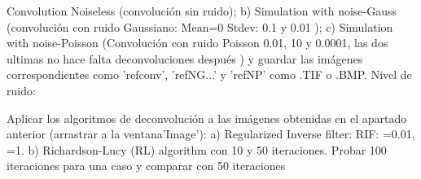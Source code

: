 \documentclass{./packages/optica-article}
\begin{document}
      Convolution Noiseless (convolución sin ruido);
        b) Simulation with noise-Gauss (convolución con ruido Gaussiano: 
        Mean=0
        Stdev: 0.1 y 0.01 );
        c) Simulation with noise-Poisson (Convolución con ruido Poisson 0.01, 10 y 0.0001, las dos ultimas no
        hace falta deconvoluciones después ) y guardar las imágenes correspondientes como ’refconv’, ’refNG...’ y ’refNP’ como .TIF o .BMP. 
        Nivel de ruido:
		\item Aplicar los algoritmos de deconvolución a las imágenes obtenidas en el apartado anterior (arrastrar a la ventana’Image’): 
		a) Regularized Inverse filter: 
		RIF: =0.01, =1. 
		b) Richardson-Lucy (RL) algorithm con 10 y 50 iteraciones. Probar 100 iteraciones para una caso y comparar con 50 iteraciones

	

\end{document}
